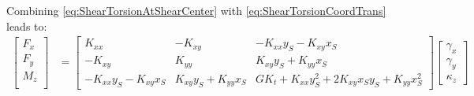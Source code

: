\documentclass[11pt]{article}
\newcommand{\sh}{{S}}
\newcommand{\GK}{G\!K_t}
\begin{document}
% 
Combining \autoref{eq:ShearTorsionAtShearCenter} with  \autoref{eq:ShearTorsionCoordTrans} leads to:
% 
\begin{align}
    \begin{bmatrix}F_x \\ F_y\\ M_z\\ \end{bmatrix}
    &=
    \begin{bmatrix}
K_{xx} & - K_{xy} & - K_{xx} y_{\sh} - K_{xy} x_{\sh}\\- K_{xy} & K_{yy} & K_{xy} y_{\sh} + K_{yy} x_{\sh}\\- K_{xx} y_{\sh} - K_{xy} x_{\sh} & K_{xy} y_{\sh} + K_{yy} x_{\sh} & \GK + K_{xx} y_{\sh}^{2} + 2 K_{xy} x_{\sh} y_{\sh} + K_{yy} x_{\sh}^{2}\end{bmatrix}
    \begin{bmatrix}\gamma_{x} \\ \gamma_{y} \\ \kappa_z \end{bmatrix}
    \label{eq:ShearTorsionOrigin}
\end{align}
\end{document}
